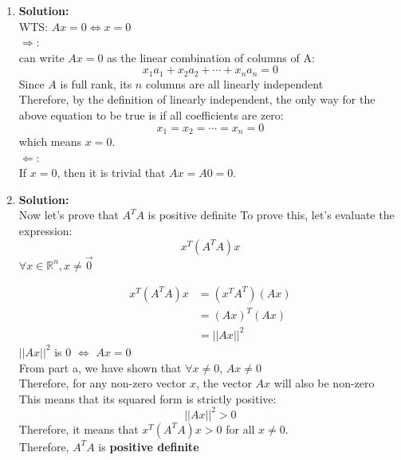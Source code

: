 \begin{enumerate}
    \item \textbf{Solution:}\\
        WTS:  \(Ax = 0 \iff x = 0\) \\
    \(\Rightarrow\):\\
    can write \(Ax = 0\) as the linear combination of columns of A:\\
    \[
        x_1a_1 + x_2a_2 + \cdots +  x_na_n = 0
    \]
    Since \(A\) is full rank, its \(n\) columns are all linearly independent\\
    Therefore, by the definition of linearly independent, the only way for the above equation to be true is if all coefficients are zero:\\
    \[
        x_1 = x_2 = \cdots = x_n = 0
    \]
    which means \(x=0\).\\
    \(\Leftarrow\):\\
    If \(x=0\), then it is trivial that \(Ax = A0 = 0\).
    
    \item \textbf{Solution:}\\
    Now let's prove that \(A^TA\) is positive definite 
    To prove this, let's evaluate the expression:\\
    \[
        x^T (A^T A) x 
    \]
    \(\forall x \in \mathbb{R}^n, x \neq \vec{0}\)
    
    \begin{align*}
        x^T(A^TA)x  &= (x^TA^T)(Ax)\\
                    &= (Ax)^T(Ax) \\
                    &= ||Ax||^{2}
    \end{align*}
    \(||Ax||^{2}\) is 0 \(\iff\) \(Ax = 0\)\\
    From part a, we have shown that \(\forall x \neq 0\),  \(Ax \neq 0\)\\
    Therefore, for any non-zero vector \(x\), the vector \(Ax\) will also be non-zero \\
    This means that its squared form is strictly positive:\\
    \[
     ||Ax||^2 > 0
    \]
    Therefore, it means that \(x^T(A^TA)x > 0\) for all \(x \neq 0\).\\
    Therefore, \(A^TA\) is \textbf{positive definite}
    

\end{enumerate}
